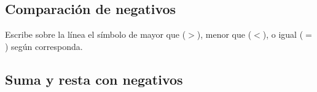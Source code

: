 \documentclass[12pt,addpoints]{evalua}
\begin{document}
\begin{questions}
\begin{multicols}{2}
\begin{parts}
            \end{parts}
      \end{multicols}

      
	\subsection{Comparación de negativos}

      \question[6] Escribe sobre la línea el símbolo de mayor que ($>$), menor que ($<$), o igual ($=$) según corresponda.

      \begin{multicols}{2}
      \end{multicols}

      \newpage
	\subsection{Suma y resta con negativos}


\end{questions}
\end{document}
